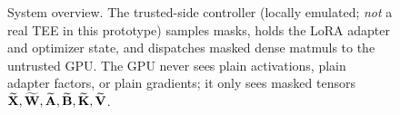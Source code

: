 \begin{figure}[h]
\caption{System overview. The trusted-side controller (locally emulated; \emph{not} a real TEE in this prototype) samples masks, holds the LoRA adapter and optimizer state, and dispatches masked dense matmuls to the untrusted GPU. The GPU never sees plain activations, plain adapter factors, or plain gradients; it only sees masked tensors $\widetilde{\mathbf{X}}, \widetilde{\mathbf{W}}, \widetilde{\mathbf{A}}, \widetilde{\mathbf{B}}, \widetilde{\mathbf{K}}, \widetilde{\mathbf{V}}$.}
\label{fig:system-overview}
\end{figure}
